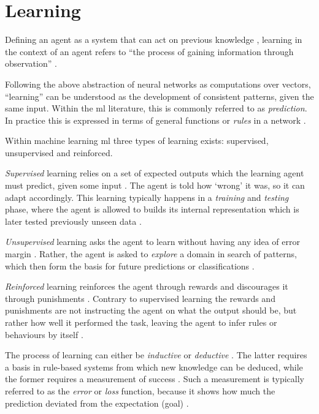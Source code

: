 \documentclass[report.tex]{subfiles}
\begin{document}
\section{Learning}  \label{sec:learnin}
Defining an \gls{agent} as a system that can act on previous knowledge
\cite{Russel2007}, learning in the context of an \gls{agent}
refers to ``the process of gaining
information through observation'' \cite{sep:learning-formal}.

Following the above abstraction of neural networks as computations over vectors,
``learning''  can be understood as the development of consistent
patterns, given the same input.
Within the \gls{ml} literature, this is commonly referred to as 
\textit{prediction}. 
In practice this is expressed in terms of general functions or
\textit{rules}  in a network \cite[p. 704.]{Russel2007}.

Within machine learning \gls{ml} three types of
learning exists: supervised, 
unsupervised  and reinforced.

\textit{Supervised} learning relies on a set of expected outputs which 
the learning \gls{agent} must predict, given some input \cite{Russel2007}.
The \gls{agent} is told how `wrong' it was, so it can adapt accordingly.
This learning typically happens in a \textit{training} and \textit{testing}
phase, where the \gls{agent} is allowed to builds its internal representation
which is later tested previously unseen data \cite{Russel2007}.

\textit{Unsupervised} learning asks the \gls{agent} to learn without
having any idea of error margin \cite{Russel2007}.
Rather, the \gls{agent} is asked to \textit{explore} a domain in search of
patterns, which then form the basis for future predictions or classifications
\cite{Russel2007}.

\textit{Reinforced} learning reinforces the \gls{agent} through
rewards and discourages it through punishments \cite{Russel2007}.
Contrary to supervised learning the rewards and punishments are not
instructing the agent on what the output should be, but rather how well
it performed the task, leaving the \gls{agent} to infer rules or
behaviours by itself \cite[p. 873]{Russel2007}.

The process of learning can either be \textit{inductive}
or \textit{deductive}  \cite[p. 704]{Russel2007}.
The latter requires a basis in rule-based systems from which new knowledge can
be deduced, while the former requires a measurement of success \cite[p. 705]{Russel2007}.
Such a measurement is typically referred to as the \textit{error} or \textit{loss}
function,
because it shows how much the prediction deviated from the expectation (goal)
\cite{Russel2007}.
\end{document}
